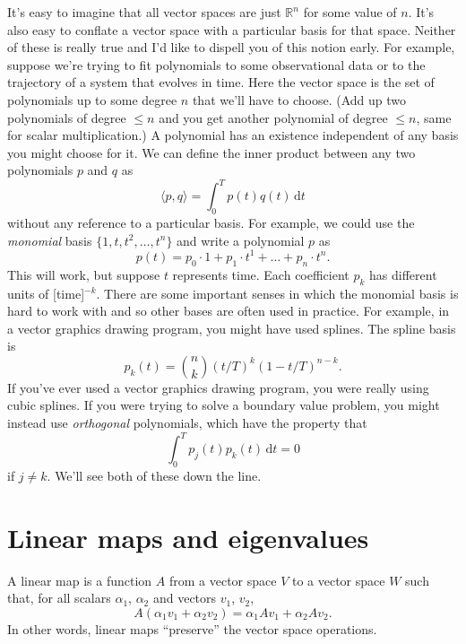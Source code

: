 \documentclass{article}
\theoremstyle{definition}
\theoremstyle{plain}
\newcommand{\ud}{\hspace{2pt}\mathrm{d}}
\begin{document}
It's easy to imagine that all vector spaces are just $\mathbb{R}^n$ for some value of $n$.
It's also easy to conflate a vector space with a particular basis for that space.
Neither of these is really true and I'd like to dispell you of this notion early.
For example, suppose we're trying to fit polynomials to some observational data or to the trajectory of a system that evolves in time.
Here the vector space is the set of polynomials up to some degree $n$ that we'll have to choose.
(Add up two polynomials of degree $\le n$ and you get another polynomial of degree $\le n$, same for scalar multiplication.)
A polynomial has an existence independent of any basis you might choose for it.
We can define the inner product between any two polynomials $p$ and $q$ as
\begin{equation}
    \langle p, q \rangle = \int_0^Tp(t)q(t)\ud t
\end{equation}
without any reference to a particular basis.
For example, we could use the \emph{monomial} basis $\{1, t, t^2, \ldots, t^n\}$ and write a polynomial $p$ as
\begin{equation}
    p(t) = p_0\cdot 1 + p_1\cdot t^1 + \ldots + p_n\cdot t^n.
\end{equation}
This will work, but suppose $t$ represents time.
Each coefficient $p_k$ has different units of [time]${}^{-k}$.
There are some important senses in which the monomial basis is hard to work with and so other bases are often used in practice.
For example, in a vector graphics drawing program, you might have used splines.
The spline basis is
\begin{equation}
    p_k(t) = \binom{n}{k}(t / T)^k(1 - t / T)^{n - k}.
\end{equation}
If you've ever used a vector graphics drawing program, you were really using cubic splines.
If you were trying to solve a boundary value problem, you might instead use \emph{orthogonal} polynomials, which have the property that
\begin{equation}
    \int_0^Tp_j(t)p_k(t)\ud t = 0
\end{equation}
if $j \neq k$.
We'll see both of these down the line.


\section{Linear maps and eigenvalues}

A linear map is a function $A$ from a vector space $V$ to a vector space $W$ such that, for all scalars $\alpha_1$, $\alpha_2$ and vectors $v_1$, $v_2$,
\begin{equation}
    A(\alpha_1v_1 + \alpha_2v_2) = \alpha_1 A v_1 + \alpha_2 A v_2.
\end{equation}
In other words, linear maps ``preserve'' the vector space operations.
\end{document}

